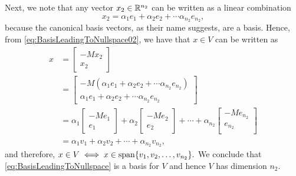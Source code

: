 Next, we note that any vector $x_2 \in \mathbb R^{n_2}$ can be written as a linear combination
$$x_2 = \alpha_1 e_1 + \alpha_2 e_2 + \cdots \alpha_{n_2} e_{n_2}, $$
because the canonical basis vectors, as their name suggests, are a basis. Hence, from \eqref{eq:BasisLeadingToNullspace02}, we have that $x\in V$ can be written as
$$\begin{aligned}
x &= \left[\begin{array}{c}
    -Mx_2 \\ x_2
\end{array}\right] \\
&= \left[\begin{array}{c}
    -M\left( \alpha_1 e_1 + \alpha_2 e_2 + \cdots \alpha_{n_2} e_{n_2} \right) \\ \alpha_1 e_1 + \alpha_2 e_2 + \cdots \alpha_{n_2} e_{n_2}
\end{array}\right]\\
&=  \alpha_1 \left[\begin{array}{c}
    -Me_1 \\ e_1
\end{array}\right] + \alpha_2 \left[\begin{array}{c}
    -Me_2 \\ e_2
\end{array}\right] + \cdots + \alpha_{n_2} \left[\begin{array}{c}
    -Me_{n_2} \\ e_{n_2}\\
\end{array}\right] \\
&= \alpha_1 v_1 + \alpha_2 v_2 + \cdots + \alpha_{n_2} v_{n_2},
\end{aligned}$$
and therefore, $x \in V \iff x \in \mathrm{span} \{ v_1, v_2, \ldots, v_{n_2} \}.$ We conclude that \eqref{eq:BasisLeadingToNullspace} is a basis for $V$ and hence $V$ has dimension $n_2$.
\Qed

